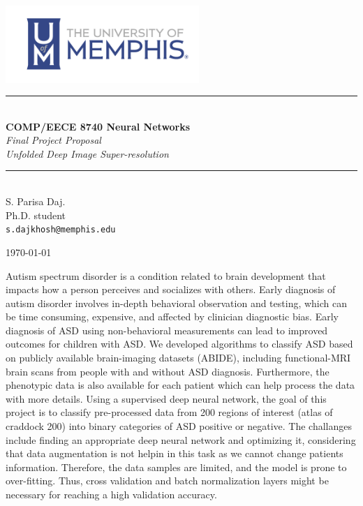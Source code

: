 \documentclass[12pt,a4paper]{article}
\newcommand{\HRule}{\rule{\linewidth}{0.5mm}}
\begin{document}
	
	\begin{titlepage}
		\begin{center}
			
			\includegraphics[width=0.55\textwidth]{figs/cslogo_horizontal.png}~\\[2cm]
			
			
			\HRule \\[0.4cm]
			{ \LARGE 
				\textbf{COMP/EECE 8740 Neural Networks}\\[0.4cm]
				\emph{Final Project Proposal}\\[0.4cm]
				\emph{Unfolded Deep Image Super-resolution}\\[0.4cm]
			}
			\HRule \\[1.5cm]
			
			
			
			{ \large
				S. Parisa Daj. \\[0.1cm]
				Ph.D. student\\[0.1cm]
				\texttt{s.dajkhosh@memphis.edu}
			}
			
			\vfill
			
			
			{\large \today}
			
		\end{center}
	\end{titlepage}

Autism spectrum disorder is a condition related to brain development that impacts how a person perceives and socializes with others. Early diagnosis of autism disorder involves in-depth behavioral observation and testing, which can be time consuming, expensive, and affected by clinician diagnostic bias. Early diagnosis of ASD using non-behavioral measurements can lead to improved outcomes for children with ASD. We developed algorithms to classify ASD based on publicly available brain-imaging datasets (ABIDE), including functional-MRI brain scans from people with and without ASD diagnosis. Furthermore, the phenotypic data is also available for each patient which can help process the data with more details. Using a supervised deep neural network, the goal of this project is to classify pre-processed data from 200 regions of interest (atlas of craddock 200) into binary categories of ASD positive or negative. The challanges include finding an appropriate deep neural network and optimizing it, considering that data augmentation is not helpin in this task as we cannot change patients information. Therefore, the data samples are limited, and the model is prone to over-fitting. Thus, cross validation and batch normalization layers might be necessary for reaching a high validation accuracy.
\end{document}

